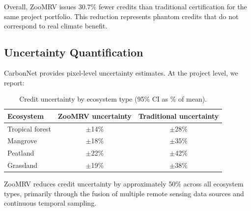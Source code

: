 Overall, ZooMRV issues 30.7\% fewer credits than traditional
certification for the same project portfolio. This reduction represents
phantom credits that do not correspond to real climate benefit.

\subsection{Uncertainty Quantification}

CarbonNet provides pixel-level uncertainty estimates. At the project
level, we report:

\begin{table}[H]
\centering
\caption{Credit uncertainty by ecosystem type (95\% CI as \% of mean).}
\label{tab:uncertainty}
\begin{tabular}{lcc}
\toprule
\textbf{Ecosystem} & \textbf{ZooMRV uncertainty} &
  \textbf{Traditional uncertainty} \\
\midrule
Tropical forest & $\pm$14\% & $\pm$28\% \\
Mangrove & $\pm$18\% & $\pm$35\% \\
Peatland & $\pm$22\% & $\pm$42\% \\
Grassland & $\pm$19\% & $\pm$38\% \\
\bottomrule
\end{tabular}
\end{table}

ZooMRV reduces credit uncertainty by approximately 50\% across all
ecosystem types, primarily through the fusion of multiple remote sensing
data sources and continuous temporal sampling.


